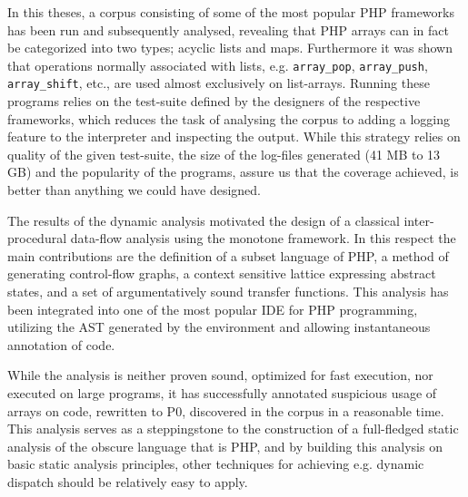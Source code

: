 

In this theses, a corpus consisting of some of the most popular PHP frameworks has been run and subsequently analysed, revealing that PHP arrays can in fact be categorized into two types; acyclic lists and maps. Furthermore it was shown that operations normally associated with lists, e.g. \texttt{array\_pop}, \texttt{array\_push}, \texttt{array\_shift}, etc., are used almost exclusively on list-arrays. Running these programs relies on the test-suite defined by the designers of the respective frameworks, which reduces the task of analysing the corpus to adding a logging feature to the interpreter and inspecting the output. While this strategy relies on quality of the given test-suite, the size of the log-files generated (41 MB to 13 GB) and the popularity of the programs, assure us that the coverage achieved, is better than anything we could have designed.


The results of the dynamic analysis motivated the design of a classical inter-procedural data-flow analysis using the monotone framework. In this respect the main contributions  are the definition of a subset language of PHP, a method of generating control-flow graphs, a context sensitive lattice expressing abstract states, and a set of argumentatively sound transfer functions. This analysis has been integrated into one of the most popular IDE for PHP programming, utilizing the AST generated by the environment and allowing instantaneous annotation of code. 

While the analysis is neither proven sound, optimized for fast execution, nor executed on large programs, it has successfully annotated suspicious usage of arrays on code, rewritten to P0, discovered in the corpus in a reasonable time. This analysis serves as a steppingstone to the construction of a full-fledged static analysis of the obscure language that is PHP, and by building this analysis on basic static analysis principles, other techniques for achieving e.g. dynamic dispatch should be relatively easy to apply. 








